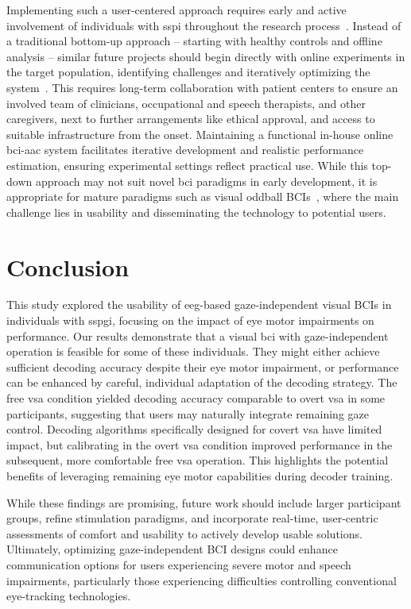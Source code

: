 \documentclass{article}
\begin{document}
Implementing such a user-centered approach requires early and active involvement
of individuals with \ac{sspi} throughout the research process~\cite{Standardization2009}.
Instead of a traditional bottom-up approach -- starting with healthy controls and
offline analysis -- similar future projects should begin directly with online experiments
in the target population, identifying challenges and iteratively optimizing the
system~\cite{FriedOken2020}.
This requires long-term collaboration with patient centers to ensure an involved
team of clinicians, occupational and speech therapists, and other caregivers, next to
further arrangements like ethical approval, and access to suitable infrastructure
from the onset.
Maintaining a functional in-house online \ac{bci}-\ac{aac} system facilitates iterative
development and realistic performance estimation, ensuring experimental settings
reflect practical use.
While this top-down approach may not suit novel \ac{bci} paradigms in early
development, it is appropriate for mature paradigms such as visual oddball
BCIs~\cite{Pan2022,Fouad2020}, where the main challenge lies in usability and
disseminating the technology to potential users.

\acresetall%
\section{Conclusion}
This study explored the usability of \ac{eeg}-based gaze-independent visual BCIs in
individuals with \ac{sspgi}, focusing on the impact of eye motor impairments
on performance.
Our results demonstrate that a visual \ac{bci} with gaze-independent operation
is feasible for some of these individuals.
They might either achieve sufficient decoding accuracy despite their eye
motor impairment, or performance can be enhanced by careful, individual
adaptation of the decoding strategy.
The free \ac{vsa} condition yielded decoding accuracy comparable to overt \ac{vsa}
in some participants, suggesting that users may naturally integrate remaining gaze control.
Decoding algorithms specifically designed for covert \ac{vsa} have limited impact,
but calibrating in the overt \ac{vsa} condition improved performance in the
subsequent, more comfortable free \ac{vsa} operation.
This highlights the potential benefits of
leveraging remaining eye motor capabilities during decoder training.

While these findings are promising, future work should include larger
participant groups, refine stimulation paradigms, and incorporate
real-time, user-centric assessments of comfort and usability to actively develop usable
solutions.
Ultimately, optimizing gaze-independent BCI designs could enhance communication
options for users experiencing severe motor and speech impairments, particularly
those experiencing difficulties controlling conventional eye-tracking technologies.
\end{document}
